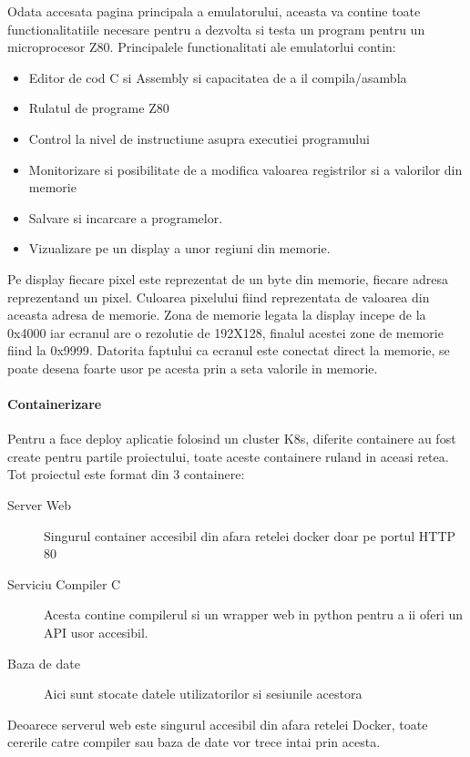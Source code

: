 \documentclass[titlepage,12pt]{article}
\DeclareRobustCommand{\code}[1]{{\ttfamily\small #1}}
\begin{document}
Odata accesata pagina principala a emulatorului, aceasta va contine toate functionalitatiile necesare pentru a dezvolta si testa un program pentru un microprocesor Z80.
Principalele functionalitati ale emulatorlui contin:
\begin{itemize}
    \item Editor de cod C si Assembly si capacitatea de a il compila/asambla
    \item Rulatul de programe Z80
    \item Control la nivel de instructiune asupra executiei programului
    \item Monitorizare si posibilitate de a modifica valoarea registrilor si a valorilor din memorie
    \item Salvare si incarcare a programelor.
    \item Vizualizare pe un display a unor regiuni din memorie. 
\end{itemize}
Pe display fiecare pixel este reprezentat de un byte din memorie, fiecare adresa reprezentand un pixel. Culoarea pixelului fiind reprezentata de valoarea din aceasta adresa de memorie.
Zona de memorie legata la display incepe de la \code{0x4000} iar ecranul are o rezolutie de \code {192X128}, finalul acestei zone de memorie fiind la \code{0x9999}.
Datorita faptului ca ecranul este conectat direct la memorie, se poate desena foarte usor pe acesta prin a seta valorile in memorie.

\paragraph{Containerizare}
Pentru a face deploy aplicatie folosind un cluster K8s, diferite containere au fost create pentru partile proiectului, toate aceste containere ruland in aceasi retea.
Tot proiectul este format din 3 containere:
\begin{description}
    \item[Server Web] Singurul container accesibil din afara retelei docker doar pe portul HTTP 80
    \item[Serviciu Compiler C] Acesta contine compilerul si un wrapper web in python pentru a ii oferi un API usor accesibil. 
    \item[Baza de date] Aici sunt stocate datele utilizatorilor si sesiunile acestora
\end{description}
Deoarece serverul web este singurul accesibil din afara retelei Docker, toate cererile catre compiler sau baza de date vor trece intai prin acesta.
\end{document}
